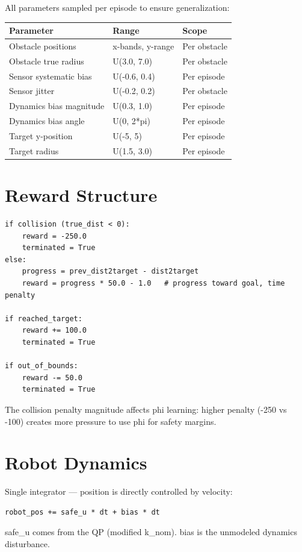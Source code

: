 \documentclass[11pt]{article}
\begin{document}
All parameters sampled per episode to ensure generalization:

\begin{tabular}{lll}
\toprule
Parameter & Range & Scope \\
\midrule
Obstacle positions & x-bands, y-range & Per obstacle \\
Obstacle true radius & U(3.0, 7.0) & Per obstacle \\
Sensor systematic bias & U(-0.6, 0.4) & Per episode \\
Sensor jitter & U(-0.2, 0.2) & Per obstacle \\
Dynamics bias magnitude & U(0.3, 1.0) & Per episode \\
Dynamics bias angle & U(0, 2*pi) & Per episode \\
Target y-position & U(-5, 5) & Per episode \\
Target radius & U(1.5, 3.0) & Per episode \\
\bottomrule
\end{tabular}


\section*{Reward Structure}

\begin{verbatim}
if collision (true_dist < 0):
    reward = -250.0
    terminated = True
else:
    progress = prev_dist2target - dist2target
    reward = progress * 50.0 - 1.0   # progress toward goal, time penalty

if reached_target:
    reward += 100.0
    terminated = True

if out_of_bounds:
    reward -= 50.0
    terminated = True
\end{verbatim}

The collision penalty magnitude affects phi learning: higher penalty (-250 vs -100) creates more pressure to use phi for safety margins.


\section*{Robot Dynamics}

Single integrator --- position is directly controlled by velocity:

\begin{verbatim}
robot_pos += safe_u * dt + bias * dt
\end{verbatim}

safe\_u comes from the QP (modified k\_nom). bias is the unmodeled dynamics disturbance.
\end{document}
